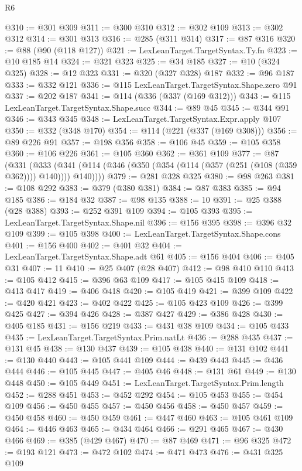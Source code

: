 \begin{lexlean}{R6}
\begin{coremodule}
@310 := @301 @309
@311 := @300 @310
@312 := @302 @109
@313 := @302 @312
@314 := @301 @313
@316 := @285 (@311 @314)
@317 := @87 @316
@320 := @88 (@90 (@118 @127))
@321 := LexLeanTarget.TargetSyntax.Ty.fn
@323 := @10 @185 @14
@324 := @321 @323
@325 := @34 @185
@327 := @10 (@324 @325)
@328 := @12 @323
@331 := @320 (@327 @328) @187
@332 := @96 @187
@333 := @332 @121
@336 := @115 LexLeanTarget.TargetSyntax.Shape.zero @91
@337 := @202 @187
@341 := @114 (@336 (@337 (@169 @312)))
@343 := @115 LexLeanTarget.TargetSyntax.Shape.succ
@344 := @89 @45
@345 := @344 @91
@346 := @343 @345
@348 := LexLeanTarget.TargetSyntax.Expr.apply @107
@350 := @332 (@348 @170)
@354 := @114 (@221 (@337 (@169 @308)))
@356 := @89 @226 @91
@357 := @198 @356
@358 := @106 @45
@359 := @105 @358
@360 := @106 @226
@361 := @105 @360
@362 := @361 @109
@377 := @87
    (@331
      (@333 (@341 (@114 (@346 (@350 (@354 (@114 (@357 (@251 (@108 (@359 @362)))) @140)))) @140))))
@379 := @281 @328 @325
@380 := @98 @263
@381 := @108 @292
@383 := @379 (@380 @381)
@384 := @87 @383
@385 := @94 @185
@386 := @184 @32
@387 := @98 @135
@388 := 10
@391 := @25 @388 (@28 @388)
@393 := @252 @391 @109
@394 := @105 @393
@395 := LexLeanTarget.TargetSyntax.Shape.nil
@396 := @156 @395
@398 := @396 @32 @109
@399 := @105 @398
@400 := LexLeanTarget.TargetSyntax.Shape.cons
@401 := @156 @400
@402 := @401 @32
@404 := LexLeanTarget.TargetSyntax.Shape.adt @61
@405 := @156 @404
@406 := @405 @31
@407 := 11
@410 := @25 @407 (@28 @407)
@412 := @98 @410 @110
@413 := @105 @412
@415 := @396 @63 @109
@417 := @105 @415 @109
@418 := @413 @417
@419 := @406 @418
@420 := @105 @419
@421 := @399 @109
@422 := @420 @421
@423 := @402 @422
@425 := @105 @423 @109
@426 := @399 @425
@427 := @394 @426
@428 := @387 @427
@429 := @386 @428
@430 := @405 @185
@431 := @156 @219
@433 := @431 @38 @109
@434 := @105 @433
@435 := LexLeanTarget.TargetSyntax.Prim.natLt
@436 := @288 @435
@437 := @131 @45
@438 := @130 @437
@439 := @105 @438
@440 := @131 @102
@441 := @130 @440
@443 := @105 @441 @109
@444 := @439 @443
@445 := @436 @444
@446 := @105 @445
@447 := @405 @46
@448 := @131 @61
@449 := @130 @448
@450 := @105 @449
@451 := LexLeanTarget.TargetSyntax.Prim.length
@452 := @288 @451
@453 := @452 @292
@454 := @105 @453
@455 := @454 @109
@456 := @450 @455
@457 := @450 @456
@458 := @450 @457
@459 := @450 @458
@460 := @450 @459
@461 := @447 @460
@463 := @105 @461 @109
@464 := @446 @463
@465 := @434 @464
@466 := @291 @465
@467 := @430 @466
@469 := @385 (@429 @467)
@470 := @87 @469
@471 := @96 @325
@472 := @193 @121
@473 := @472 @102
@474 := @471 @473
@476 := @431 @325 @109

\end{coremodule}
\end{lexlean}
